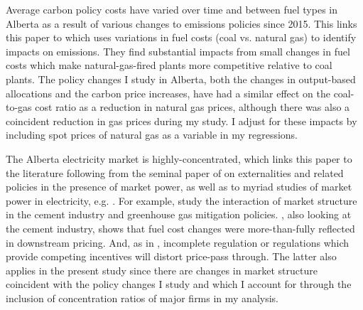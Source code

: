 \documentclass[12pt]{article}
\begin{document}
Average carbon policy costs have varied over time and between fuel types in Alberta as a result of various changes to emissions policies since 2015. This links this paper to \cite{cullen_mansur} which uses variations in fuel costs (coal vs. natural gas) to identify impacts on emissions. They find substantial impacts from small changes in fuel costs which make natural-gas-fired plants more competitive relative to coal plants. The policy changes I study in Alberta, both the changes in output-based allocations and the carbon price increases, have had a similar effect on the coal-to-gas cost ratio as a reduction in natural gas prices, although there was also a coincident reduction in gas prices during my study. I adjust for these impacts by including spot prices of natural gas as a variable in my regressions.

The Alberta electricity market is highly-concentrated, which links this paper to the literature following from the seminal paper of \cite{buchanan1969external} on externalities and related policies in the presence of market power, as well as to myriad studies of market power in electricity, e.g. \cite{borenstein_bushnell_wolak_2002}. For example, \cite{fowlie_reguant_ryan_2016} study the interaction of market structure in the cement industry and greenhouse gas mitigation policies. \cite{miller_cement}, also looking at the cement industry, shows that fuel cost changes were more-than-fully reflected in downstream pricing. And, as in \cite{holland_emissions_2012}, incomplete regulation or regulations which provide competing incentives will distort price-pass through. The latter also applies in the present study since there are changes in market structure coincident with the policy changes I study and which I account for through the inclusion of concentration ratios of major firms in my analysis. 
\end{document}
